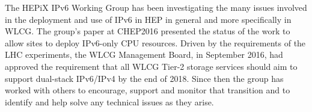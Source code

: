 
The HEPiX IPv6 Working Group \cite{ipv6wg} has been investigating the many issues involved in the deployment and use of
IPv6 in HEP in general and more specifically in WLCG. The group's paper at CHEP2016 \cite{ipv6chep2016}
presented the status of the work to allow sites to deploy IPv6-only CPU resources. Driven by the
requirements of the LHC experiments, the WLCG Management Board, in September 2016, had approved the requirement
that all WLCG Tier-2 storage services should aim to support dual-stack IPv6/IPv4 by the end of 2018. Since then the
group has worked with others to encourage, support and monitor that transition and to identify and help
solve any technical issues as they arise.


 
